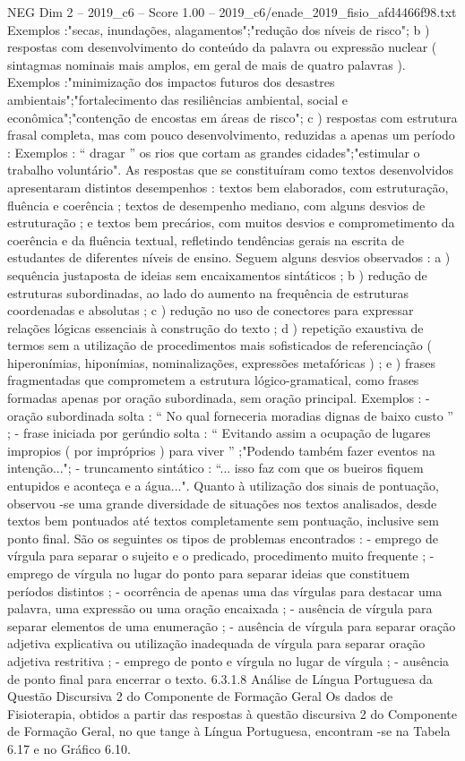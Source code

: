 \begin{textsample}{NEG Dim 2 – 2019\_c6 – Score 1.00 – 2019\_c6/enade\_2019\_fisio\_afd4466f98.txt}
Exemplos :"secas, inundações, alagamentos";"redução dos níveis de risco"; b ) respostas com desenvolvimento do conteúdo da palavra ou expressão nuclear ( sintagmas nominais mais amplos, em geral de mais de quatro palavras ).
Exemplos :"minimização dos impactos futuros dos desastres ambientais";"fortalecimento das resiliências ambiental, social e econômica";"contenção de encostas em áreas de risco"; c ) respostas com estrutura frasal completa, mas com pouco desenvolvimento, reduzidas a apenas um período : Exemplos : “ dragar ” os rios que cortam as grandes cidades";"estimular o trabalho voluntário".
As respostas que se constituíram como textos desenvolvidos apresentaram distintos desempenhos : textos bem elaborados, com estruturação, fluência e coerência ; textos de desempenho mediano, com alguns desvios de estruturação ; e textos bem precários, com muitos desvios e comprometimento da coerência e da fluência textual, refletindo tendências gerais na escrita de estudantes de diferentes níveis de ensino.
Seguem alguns desvios observados : a ) sequência justaposta de ideias sem encaixamentos sintáticos ; b ) redução de estruturas subordinadas, ao lado do aumento na frequência de estruturas coordenadas e absolutas ; c ) redução no uso de conectores para expressar relações lógicas essenciais à construção do texto ; d ) repetição exaustiva de termos sem a utilização de procedimentos mais sofisticados de referenciação ( hiperonímias, hiponímias, nominalizações, expressões metafóricas ) ; e ) frases fragmentadas que comprometem a estrutura lógico-gramatical, como frases formadas apenas por oração subordinada, sem oração principal.
Exemplos : - oração subordinada solta : “ No qual forneceria moradias dignas de baixo custo ” ; - frase iniciada por gerúndio solta : “ Evitando assim a ocupação de lugares impropios ( por impróprios ) para viver ” ;"Podendo também fazer eventos na intenção..."; - truncamento sintático : “... isso faz com que os bueiros fiquem entupidos e aconteça e a água...".
Quanto à utilização dos sinais de pontuação, observou -se uma grande diversidade de situações nos textos analisados, desde textos bem pontuados até textos completamente sem pontuação, inclusive sem ponto final.
São os seguintes os tipos de problemas encontrados : - emprego de vírgula para separar o sujeito e o predicado, procedimento muito frequente ; - emprego de vírgula no lugar do ponto para separar ideias que constituem períodos distintos ; - ocorrência de apenas uma das vírgulas para destacar uma palavra, uma expressão ou uma oração encaixada ; - ausência de vírgula para separar elementos de uma enumeração ; - ausência de vírgula para separar oração adjetiva explicativa ou utilização inadequada de vírgula para separar oração adjetiva restritiva ; - emprego de ponto e vírgula no lugar de vírgula ; - ausência de ponto final para encerrar o texto. 6.3.1.8 Análise de Língua Portuguesa da Questão Discursiva 2 do Componente de Formação Geral Os dados de Fisioterapia, obtidos a partir das respostas à questão discursiva 2 do Componente de Formação Geral, no que tange à Língua Portuguesa, encontram -se na Tabela 6.17 e no Gráfico 6.10.

\end{textsample}
